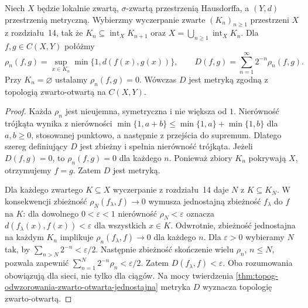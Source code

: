\begin{twierdzenie}
\label{thm:topog-odwzorowania-metryka-wyczerpanie}
Niech $X$ będzie lokalnie zwartą,
$\sigma$-zwartą przestrzenią Hausdorffa,
a $(Y,d)$ przestrzenią metryczną.
Wybierzmy wyczerpanie zwarte
$(K_n)_{n\ge1}$ przestrzeni $X$
z rozdziału~14, tak że
$K_n\subseteq\operatorname{int}_XK_{n+1}$
oraz $X=\bigcup_{n\ge1}\operatorname{int}_XK_n$.
Dla $f,g\in C(X,Y)$ połóżmy
\[
\rho_n(f,g)=
\sup_{x\in K_n}\min\{1,d(f(x),g(x))\},
\qquad
D(f,g)=\sum_{n=1}^\infty
2^{-n}\rho_n(f,g).
\]
Przy $K_n=\varnothing$ ustalamy
$\rho_n(f,g)=0$.
Wówczas $D$ jest metryką zgodną
z topologią zwarto-otwartą na $C(X,Y)$.
\end{twierdzenie}
\begin{proof}
Każda $\rho_n$ jest nieujemna,
symetryczna i nie większa od $1$.
Nierówność trójkąta wynika
z nierówności
$\min\{1,a+b\}\le
\min\{1,a\}+\min\{1,b\}$
dla $a,b\ge0$, stosowanej punktowo,
a następnie z przejścia do supremum.
Dlatego szereg definiujący $D$
jest zbieżny i spełnia nierówność
trójkąta. Jeżeli $D(f,g)=0$,
to $\rho_n(f,g)=0$ dla każdego $n$.
Ponieważ zbiory $K_n$ pokrywają $X$,
otrzymujemy $f=g$.
Zatem $D$ jest metryką.

Dla każdego zwartego $K\subseteq X$
wyczerpanie z rozdziału~14 daje
$N$ z $K\subseteq K_N$.
W konsekwencji zbieżność
$\rho_N(f_\lambda,f)\to0$
wymusza jednostajną zbieżność
$f_\lambda$ do $f$ na $K$:
dla dowolnego $0<\varepsilon<1$
nierówność $\rho_N<\varepsilon$
oznacza $d(f_\lambda(x),f(x))
<\varepsilon$ dla wszystkich $x\in K$.
Odwrotnie, zbieżność jednostajna
na każdym $K_n$ implikuje
$\rho_n(f_\lambda,f)\to0$
dla każdego $n$.
Dla $\varepsilon>0$ wybieramy
$N$ tak, by
$\sum_{n>N}2^{-n}<\varepsilon/2$.
Następnie zbieżność skończenie
wielu $\rho_n$, $n\le N$,
pozwala zapewnić
$\sum_{n=1}^{N}2^{-n}\rho_n
<\varepsilon/2$.
Zatem $D(f_\lambda,f)<\varepsilon$.
Oba rozumowania obowiązują
dla sieci, nie tylko dla ciągów.
Na mocy twierdzenia
\ref{thm:topog-odwzorowania-zwarto-otwarta-jednostajna}
metryka $D$ wyznacza
topologię zwarto-otwartą.
\end{proof}

